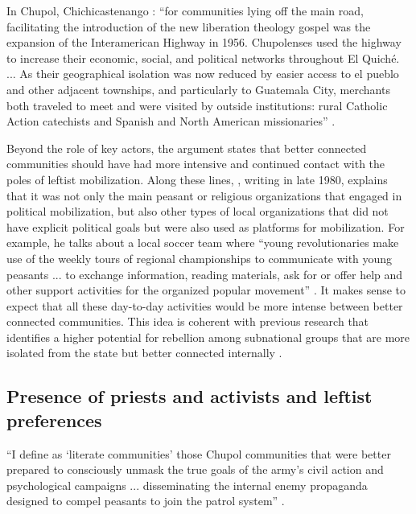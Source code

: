 \documentclass[12pt, notitlepage]{article}
\begin{document}
In Chupol, Chichicastenango \citet{Esparza:2018uw}: ``for communities lying off the main road, facilitating the introduction of the new liberation theology gospel was the expansion of the Interamerican Highway in 1956. Chupolenses used the highway to increase their economic, social, and political networks throughout El Quiché. ... As their geographical isolation was now reduced by easier access to el pueblo and other adjacent townships, and particularly to Guatemala City, merchants both traveled to meet and were visited by outside institutions: rural Catholic Action catechists and Spanish and North American missionaries'' \citep[93--94]{Esparza:2018uw}.


Beyond the role of key actors, the argument states that better connected communities should have had more intensive and continued contact with the poles of leftist mobilization.
Along these lines, \citet{Bran:1985tc}, writing in late 1980, explains that it was not only the main peasant or religious organizations that engaged in political mobilization, but also other types of local organizations that did not have explicit political goals but were also used as platforms for mobilization.
For example, he talks about a local soccer team where ``young revolutionaries make use of the weekly tours of regional championships to communicate with young peasants ... to exchange information, reading materials, ask for or offer help and other support activities for the organized popular movement'' \citep[15]{Bran:1985tc}.
It makes sense to expect that all these day-to-day activities would be more intense between better connected communities.
This idea is coherent with previous research that identifies a higher potential for rebellion among subnational groups that are more isolated from the state but better connected internally \citep{Muller-Crepon:2021va}.

\subsection*{Presence of priests and activists and leftist preferences}

``I define as `literate communities' those Chupol communities that were better prepared to consciously unmask the true goals of the army's civil action and psychological campaigns ... disseminating the internal enemy propaganda designed to compel peasants to join the patrol system'' \citep[92]{Esparza:2018uw}.
\end{document}

